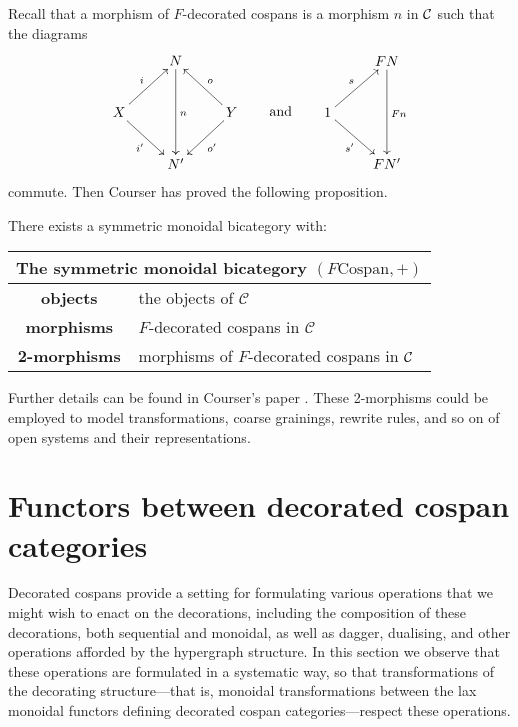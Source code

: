 Recall that a morphism of $F$-decorated cospans is a morphism $n$ in $\mathcal C$ such
that the diagrams
\[
  \begin{aligned}
    \xymatrix{
      & N \ar[dd]^n \\  
      X \ar[ur]^{i} \ar[dr]_{i'} && Y \ar[ul]_{o} \ar[dl]^{o'}\\
      & N'
    }
  \end{aligned}
  \qquad \mbox{and}
  \qquad
  \begin{aligned}
    \xymatrix{
      & FN \ar[dd]^{Fn} \\
      1 \ar[ur]^{s} \ar[dr]_{s'} \\
      & FN'
    }
  \end{aligned}
\]
commute. Then Courser has proved the following proposition.
\begin{proposition}
  There exists a symmetric monoidal bicategory with:
\begin{center}
  \begin{tabular}{| c | p{} |}
    \hline
    \multicolumn{2}{|c|}{The symmetric monoidal bicategory $(F\mathrm{Cospan},+)$} \\
    \hline
    \textbf{objects} & the objects of $\mathcal C$ \\ 
    \textbf{morphisms} & $F$-decorated cospans in
    $\mathcal C$\\ 
    \textbf{2-morphisms} & morphisms of $F$-decorated cospans in $\mathcal C$ \\
    \hline
  \end{tabular}
\end{center}
\end{proposition}
Further details can be found in Courser's paper \cite{Cou16}. These 2-morphisms
could be employed to model transformations, coarse grainings, rewrite rules, and
so on of open systems and their representations.

\section{Functors between decorated cospan categories} \label{sec:dcf}

Decorated cospans provide a setting for formulating various operations that we
might wish to enact on the decorations, including the composition of these
decorations, both sequential and monoidal, as well as dagger, dualising, and
other operations afforded by the hypergraph structure. In this section we
observe that these operations are formulated in a systematic way, so that
transformations of the decorating structure---that is, monoidal transformations
between the lax monoidal functors defining decorated cospan categories---respect
these operations. 

